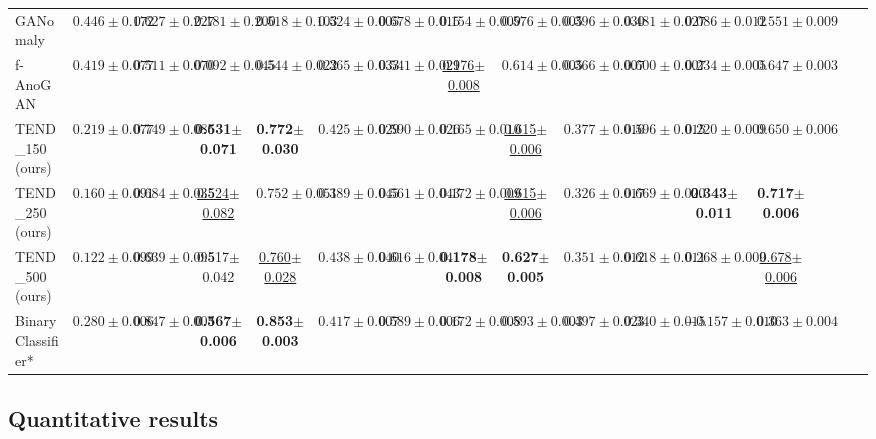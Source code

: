 \documentclass[12pt]{spieman}  %
\begin{document}
\begin{spacing}{2}
\begin{table}[tp]
{\begin{tabular}{|l|cccc|cccc|cccc|cccc|}
GANomaly~\cite{akcay2018ganomaly:akcay}       & {$0.446\pm0.172$}     & {$0.627\pm0.227$} & {$0.181\pm0.200$}   & {$0.518\pm0.103$}  & {$0.524\pm0.005$}   & {$0.678\pm0.015$} & {$0.154\pm0.009$}  & {$0.576\pm0.005$} & {$0.396\pm0.030$} & {$0.481\pm0.027$} & {$0.086\pm0.012$} & {$0.551\pm0.009$}\\
f-AnoGAN~\cite{schlegl2019f} & {$0.419\pm0.077$}     & {$0.511\pm0.070$} & {$0.092\pm0.045$}   & {$0.544\pm0.022$} & {$0.365\pm0.033$}  & {$0.541\pm0.029$}  &  {\underline{0.176$\pm$0.008}}  & {$0.614\pm0.005$}  &  {$0.366\pm0.007$} & {$0.600\pm0.007$} & {$0.234\pm0.005$}  & {$0.647\pm0.003$} \\
\hline
TEND\_150 (ours)    & {$0.219\pm0.077$}        & {$0.749\pm0.086$}  & {\textbf{0.531$\pm$0.071}}     & {\textbf{0.772$\pm$0.030}}  & {$0.425\pm0.029$}      & {$0.590\pm0.026$}  & {$0.165\pm0.010$}    & {\underline{0.615$\pm$0.006}}      & {$0.377\pm0.016$} & {$0.596\pm0.015$} & {$0.220\pm0.009$} & {$0.650\pm0.006$} \\
TEND\_250 (ours)    & {$0.160\pm0.091$}        & {$0.684\pm0.035$}  & {\underline{0.524$\pm$0.082}}     & {$0.752\pm0.051$}  & {$0.389\pm0.045$}       & {$0.561\pm0.043$}   & {$0.172\pm0.009$}  & {\underline{0.615$\pm$0.006}}       & {$0.326\pm0.017$} & {$0.669\pm0.020$} & {\textbf{0.343$\pm$0.011}} & {\textbf{0.717$\pm$0.006}} \\ 
TEND\_500 (ours)    & {$0.122\pm0.099$}        & {$0.639\pm0.095$}  & {0.517$\pm$0.042}     & {\underline{0.760$\pm$0.028}}  & {$0.438\pm0.040$}       & {$0.616\pm0.041$}   & {\textbf{0.178$\pm$0.008}} & {\textbf{0.627$\pm$0.005}}       & {$0.351\pm0.012$} & {$0.618\pm0.011$} & {$0.268\pm0.009$} & {\underline{0.678$\pm$0.006}} \\ \hline
BinaryClassifier* & {$0.280\pm0.006$}    & {$0.847\pm0.003$}  & {\textbf{0.567$\pm$0.006}}  & {\textbf{0.853$\pm$0.003}}  & {$0.417\pm0.007$}   &{$0.589\pm0.006$}  & {$0.172\pm0.008$} & {$0.593\pm0.003$}    & {$0.497\pm0.023$} & {$0.340\pm0.015$} & {$-0.157\pm0.010$} & {$0.363\pm0.004$} \\ \hline
\end{tabular}%
}
\end{table}


\subsection{Quantitative results}

\end{spacing}
\end{document}
